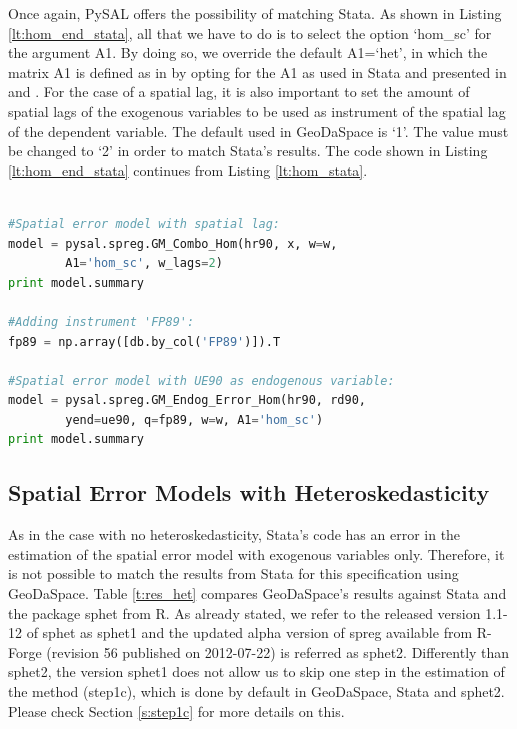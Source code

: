 \documentclass{article}
\begin{document}
Once again, PySAL offers the possibility of matching Stata. As shown in Listing \ref{lt:hom_end_stata}, all that we have to do is to select the option `hom\_sc' for the argument A1. By doing so, we override the default A1=`het', in which the matrix A1 is defined as in \citet{Arraiz10} by opting for the A1 as used in Stata and presented in \citet{Drukker10} and \citet{Drukker11}. For the case of a spatial lag, it is also important to set the amount of spatial lags of the exogenous variables to be used as instrument of the spatial lag of the dependent variable. The default used in GeoDaSpace is `1'. The value must be changed to `2' in order to match Stata's results. The code shown in Listing \ref{lt:hom_end_stata} continues from Listing \ref{lt:hom_stata}.

\begin{code}
\begin{lstlisting}[label=lt:hom_end_stata,caption=Using PySAL to match the results of spatial error models with endogenous variables or spatial lag from Stata,language=Python]

#Spatial error model with spatial lag:
model = pysal.spreg.GM_Combo_Hom(hr90, x, w=w, 
        A1='hom_sc', w_lags=2)
print model.summary

#Adding instrument 'FP89':
fp89 = np.array([db.by_col('FP89')]).T

#Spatial error model with UE90 as endogenous variable:
model = pysal.spreg.GM_Endog_Error_Hom(hr90, rd90,
        yend=ue90, q=fp89, w=w, A1='hom_sc')
print model.summary

\end{lstlisting}
\end{code}

\subsection{Spatial Error Models with Heteroskedasticity}

As in the case with no heteroskedasticity, Stata's code has an error in the estimation of the spatial error model with exogenous variables only. Therefore, it is not possible to match the results from Stata for this specification using GeoDaSpace. Table \ref{t:res_het} compares GeoDaSpace's results against Stata and the package sphet from R. As already stated, we refer to the released version 1.1-12 of sphet as sphet1 and the updated alpha version of spreg available from R-Forge (revision 56 published on 2012-07-22) is referred as sphet2. Differently than sphet2, the version sphet1 does not allow us to skip one step in the estimation of the method (step1c), which is done by default in GeoDaSpace, Stata and sphet2. Please check Section \ref{s:step1c} for more details on this.
\end{document}
